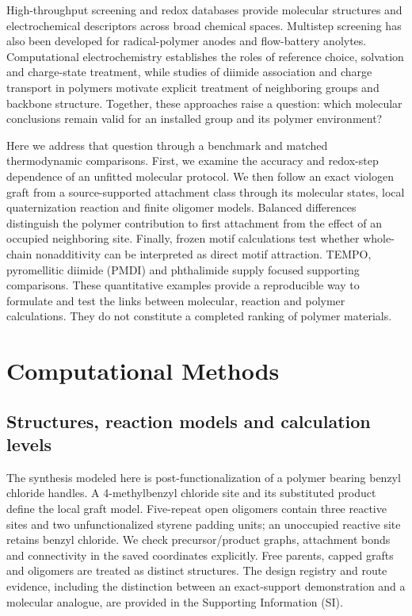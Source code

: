 \documentclass[11pt]{article}
\begin{document}
High-throughput screening and redox databases provide molecular structures and electrochemical descriptors across broad chemical spaces.\cite{er2015,d3tales2023,reddb2022} Multistep screening has also been developed for radical-polymer anodes and flow-battery anolytes.\cite{achazi2024screening} Computational electrochemistry establishes the roles of reference choice, solvation and charge-state treatment,\cite{marenich2014,fc2010,elhajj2024} while studies of diimide association and charge transport in polymers motivate explicit treatment of neighboring groups and backbone structure.\cite{wiberg2021,hopping2013,mohanty2026backbone} Together, these approaches raise a question: which molecular conclusions remain valid for an installed group and its polymer environment?

Here we address that question through a benchmark and matched thermodynamic comparisons. First, we examine the accuracy and redox-step dependence of an unfitted molecular protocol. We then follow an exact viologen graft from a source-supported attachment class through its molecular states, local quaternization reaction and finite oligomer models. Balanced differences distinguish the polymer contribution to first attachment from the effect of an occupied neighboring site. Finally, frozen motif calculations test whether whole-chain nonadditivity can be interpreted as direct motif attraction. TEMPO, pyromellitic diimide (PMDI) and phthalimide supply focused supporting comparisons. These quantitative examples provide a reproducible way to formulate and test the links between molecular, reaction and polymer calculations. They do not constitute a completed ranking of polymer materials.

\section{Computational Methods}
\subsection{Structures, reaction models and calculation levels}
The synthesis modeled here is post-functionalization of a polymer bearing benzyl chloride handles. A 4-methylbenzyl chloride site and its substituted product define the local graft model. Five-repeat open oligomers contain three reactive sites and two unfunctionalized styrene padding units; an unoccupied reactive site retains benzyl chloride. We check precursor/product graphs, attachment bonds and connectivity in the saved coordinates explicitly. Free parents, capped grafts and oligomers are treated as distinct structures. The design registry and route evidence, including the distinction between an exact-support demonstration and a molecular analogue, are provided in the Supporting Information (SI).
\end{document}
